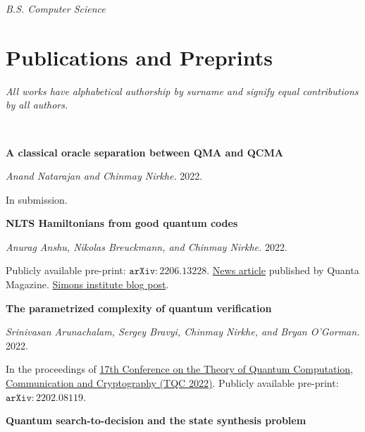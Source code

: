 \documentclass[11pt]{article}
\begin{document}
\textit{B.S. Computer Science}








\section{Publications and Preprints}
\textit{All works have alphabetical authorship by surname and signify equal contributions by all authors.}

\
\begin{enumerate}[{leftmargin=*,start=11,label=[\arabic*]\addtocounter{enumi}{-2}}]

\item \textbf{A classical oracle separation between QMA and QCMA}

\emph{Anand Natarajan and Chinmay Nirkhe.} 2022.

In submission.

\item \textbf{NLTS Hamiltonians from good quantum codes}

\emph{Anurag Anshu, Nikolas Breuckmann, and Chinmay Nirkhe.} 2022.

Publicly available pre-print: \href{https://arxiv.org/abs/2206.13228}{$\mathtt{arXiv:2206.13228}$}. \href{https://www.quantamagazine.org/computer-science-proof-lifts-limits-on-quantum-entanglement-20220718/}{News article} published by Quanta Magazine. \href{https://blog.simons.berkeley.edu/2022/08/the-blind-men-and-the-quantum-elephants/}{Simons institute blog post}.

\item \textbf{The parametrized complexity of quantum verification}

\emph{Srinivasan Arunachalam, Sergey Bravyi, Chinmay Nirkhe, and Bryan O'Gorman.} 2022.

In the proceedings of \href{https://tqc2022-conference.iquist.illinois.edu/}{17th Conference on the Theory of Quantum Computation, Communication and Cryptography (TQC 2022)}. Publicly available pre-print: \href{https://arxiv.org/abs/2202.08119}{$\mathtt{arXiv:2202.08119}$}.

\item \textbf{Quantum search-to-decision and the state synthesis problem}


\end{enumerate}
\end{document}

